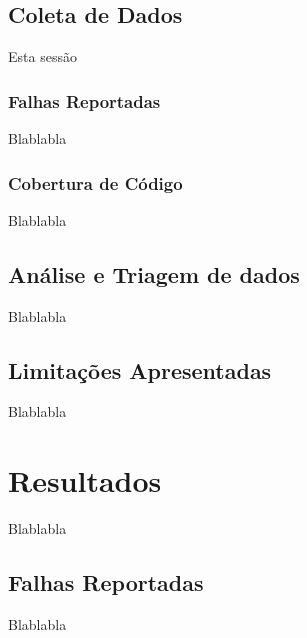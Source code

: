 \documentclass[11.5pt]{article}
\begin{document}

\subsection{Coleta de Dados}

Esta sessão

\subsubsection{Falhas Reportadas}
Blablabla

\subsubsection{Cobertura de Código}
Blablabla


\subsection{Análise e Triagem de dados}
Blablabla


\subsection{Limitações Apresentadas}
Blablabla




\section{Resultados}
Blablabla


\subsection{Falhas Reportadas}
Blablabla
\end{document}
